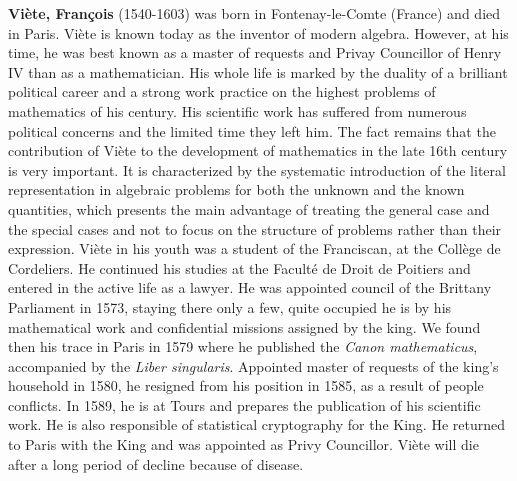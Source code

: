 \textbf{Viète, François} (1540-1603) was born in Fontenay-le-Comte (France) and died in Paris. Viète is known today as the inventor of modern algebra. However, at his time, he was best known as a master of requests and Privay Councillor of Henry IV than as a mathematician. His whole life is marked by the duality of a brilliant political career and a strong work practice on the highest problems of mathematics of his century. His scientific work has suffered from numerous political concerns and the limited time they left him. The fact remains that the contribution of Viète to the development of mathematics in the late 16th century is very important. It is characterized by the systematic introduction of the literal representation in algebraic problems for both the unknown and the known quantities, which presents the main advantage of treating the general case and the special cases and not to focus on the structure of problems rather than their expression. Viète in his youth was a student of the Franciscan, at the Collège de Cordeliers. He continued his studies at the Faculté de Droit de Poitiers and entered in the active life as a lawyer. He was appointed council of the Brittany Parliament in 1573, staying there only a few, quite occupied he is by his mathematical work and confidential missions assigned by the king. We found then his trace in Paris in 1579 where he published the \textit{Canon mathematicus}, accompanied by the \textit{Liber singularis}. Appointed master of requests of the king's household in 1580, he resigned from his position in 1585, as a result of people conflicts. In 1589, he is at Tours and prepares the publication of his scientific work. He is also responsible of statistical cryptography for the King. He returned to Paris with the King and was appointed as Privy Councillor. Viète will die after a long period of decline because of disease.

{}
\label{sec:W}

